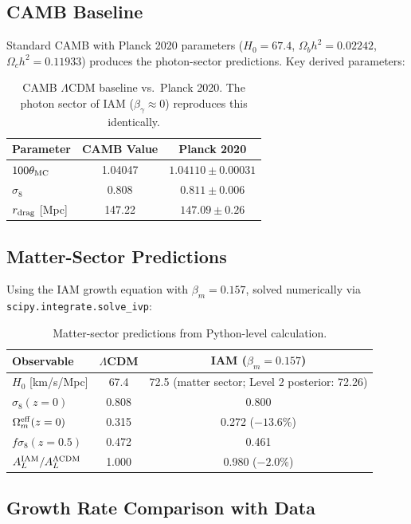 \documentclass[11pt,letterpaper]{article}
\begin{document}
\subsection{CAMB Baseline}

Standard CAMB with Planck 2020 parameters ($H_0 = 67.4$, $\Omega_b h^2 = 0.02242$, $\Omega_c h^2 = 0.11933$) produces the photon-sector predictions. Key derived parameters:

\begin{table}[h]
\centering
\begin{tabular}{lcc}
\toprule
Parameter & CAMB Value & Planck 2020 \\
\midrule
$100\theta_{\rm MC}$ & 1.04047 & $1.04110 \pm 0.00031$ \\
$\sigma_8$ & 0.808 & $0.811 \pm 0.006$ \\
$r_{\rm drag}$ [Mpc] & 147.22 & $147.09 \pm 0.26$ \\
\bottomrule
\end{tabular}
\caption{CAMB $\Lambda$CDM baseline vs.\ Planck 2020. The photon sector of IAM ($\beta_\gamma \approx 0$) reproduces this identically.}
\end{table}

\subsection{Matter-Sector Predictions}

Using the IAM growth equation with $\beta_m = 0.157$, solved numerically via \texttt{scipy.integrate.solve\_ivp}:

\begin{table}[h]
\centering
\begin{tabular}{lcc}
\toprule
Observable & $\Lambda$CDM & IAM ($\beta_m = 0.157$) \\
\midrule
$H_0$ [km/s/Mpc] & 67.4 & 72.5 (matter sector; Level 2 posterior: 72.26) \\
$\sigma_8(z=0)$ & 0.808 & 0.800 \\
$\Omega_m^{\rm eff}(z=0)$ & 0.315 & 0.272 ($-13.6$\%) \\
$f\sigma_8(z=0.5)$ & 0.472 & 0.461 \\
$A_L^{\rm IAM}/A_L^{\Lambda\rm CDM}$ & 1.000 & 0.980 ($-2.0$\%) \\
\bottomrule
\end{tabular}
\caption{Matter-sector predictions from Python-level calculation.}
\end{table}

\subsection{Growth Rate Comparison with Data}
\end{document}
